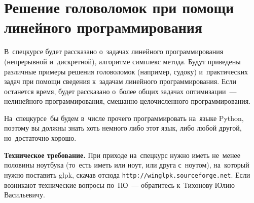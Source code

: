 
\section*{Решение головоломок при помощи линейного программирования}



\begingroup
    \providecommand\url{\texttt}

В~спецкурсе будет рассказано о~задачах линейного программирования (непрерывной
и~дискретной), алгоритме симплекс метода.
Будут приведены различные примеры решения головоломок (например, судоку)
и~практических задач при помощи сведения к~задачам линейного программирования.
Если останется время, будет рассказано о~более общих задачах оптимизации~---
нелинейного программирования, смешанно-целочисленного программирования.

На~спецкурсе~бы будем в~числе прочего программировать на~языке Python, поэтому
вы должны знать хоть немного либо этот язык, либо любой другой, но~достаточно
хорошо.

\textbf{Техническое требование.}
При приходе на~спецкурс нужно иметь не~менее половины ноутбука (то~есть иметь
или ноут, или друга с~ноутом), на~который нужно поставить \textsf{glpk}, скачав
отсюда \url{http://winglpk.sourceforge.net}.
Если возникают технические вопросы по~ПО~--- обратитесь
к~Тихонову Юлию Васильевичу.

\endgroup %

